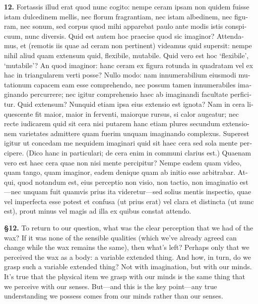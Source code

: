 \beginnumbering
\pstart
\begin{latin}
    \textenglish{\textbf{12.}} Fortassis illud erat quod nunc cogito: nempe ceram ipsam non quidem fuisse istam dulcedinem mellis, nec florum fragrantiam, nec istam albedinem, nec figuram, nec sonum, sed corpus quod mihi apparebat paulo ante modis istis conspicuum, nunc diversis. Quid est autem hoc praecise quod sic imaginor? Attendamus, et (remotis iis quae ad ceram non pertinent) videamus quid supersit: nempe nihil aliud quam extensum quid, flexibile, mutabile. Quid vero est hoc `flexibile', `mutabile'? An quod imaginor: hanc ceram ex figura rotunda in quadratam vel ex hac in triangularem verti posse? Nullo modo: nam innumerabilium eiusmodi mutationum capacem eam esse comprehendo, nec possum tamen innumerabiles imaginando percurrere; nec igitur comprehensio haec ab imaginandi facultate perficitur. Quid extensum? Nunquid etiam ipsa eius extensio est ignota? Nam in cera liquescente fit maior, maior in ferventi, maiorque rursus, si calor augeatur; nec recte iudicarem quid sit cera nisi putarem hanc etiam plures secundum extensionem varietates admittere quam fuerim unquam imaginando complexus. Superest igitur ut concedam me nequidem imaginari quid sit haec cera sed sola mente percipere. (Dico hanc in particulari; de cera enim in communi clarius est.) Quaenam vero est haec cera quae non nisi mente percipitur? Nempe eadem quam video, quam tango, quam imaginor, eadem denique quam ab initio esse arbitrabar. Atqui, quod notandum est, eius perceptio non visio, non tactio, non imaginatio est---nec unquam fuit quamvis prius ita videretur---sed solius mentis inspectio, quae vel imperfecta esse potest et confusa (ut prius erat) vel clara et distincta (ut nunc est), prout minus vel magis ad illa ex quibus constat attendo.
\end{latin}
\pend
\endnumbering

\prenotes

\textbf{§12.} To return to our question, what was the clear perception that we had of the wax? If it was none of the sensible qualities (which we've already agreed can change while the wax remains the same), then what's left? Perhaps only that we perceived the wax as a body: a variable extended thing. And how, in turn, do we grasp such a variable extended thing? Not with imagination, but with our minds. It's true that the physical item we grasp with our minds is the same thing that we perceive with our senses. But---and this is the key point---any true understanding we possess comes from our minds rather than our senses.

